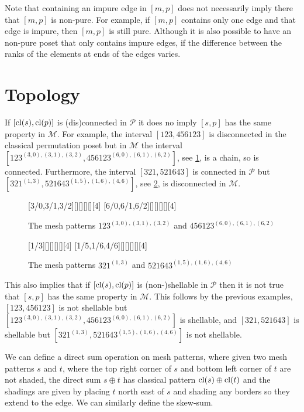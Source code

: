 \documentclass[11pt,a4paper,oneside]{article}
\begin{document}
Note that containing an impure edge in $[m,p]$ does not necessarily imply there
that $[m,p]$ is non-pure. For example, if $[m,p]$ contains only one edge and
that edge is impure, then $[m,p]$ is still pure. Although it is also possible
to have an non-pure poset that only contains impure edges, if the difference
between the ranks of the elements at ends of the edges varies.


\section{Topology}

If $[\operatorname{\textrm{cl}}(s),\operatorname{\textrm{cl}}(p)]$ is (dis)connected in $\mathcal{P}$ it does no imply $[s,p]$
has the same property in $\mathcal{M}$. For example, the interval $[123,456123]$
is disconnected in the classical permutation poset but in $\mathcal{M}$ the
interval $[123^{(3,0),(3,1),(3,2)},456123^{(6,0),(6,1),(6,2)}]$, see
\cref{fig:123}, is a chain, so is connected. Furthermore, the interval
$[321,521643]$ is connected in $\mathcal{P}$ but $[321^{(1, 3)},521643^{(1, 5),
(1, 6), (4, 6)}]$, see \cref{fig:321}, is disconnected in $\mathcal{M}$.

\begin{figure}\centering
{}[3/0,3/1,3/2][][][][][4]
[6/0,6/1,6/2][][][][][4]
\caption{The mesh patterns $123^{(3,0),(3,1),(3,2)}$ and $456123^{(6,0),(6,1),(6,2)}$}\label{fig:123}
\end{figure}
\begin{figure}\centering
{}[1/3][][][][][4]
[1/5,1/6,4/6][][][][][4]
\caption{The mesh patterns $321^{(1, 3)}$ and $521643^{(1, 5), (1, 6), (4, 6)}$}\label{fig:321}
\end{figure}

This also implies that if $[\operatorname{\textrm{cl}}(s),\operatorname{\textrm{cl}}(p)]$ is (non-)shellable in $\mathcal{P}$
then it is not true that $[s,p]$ has the same property in $\mathcal{M}$. This
follows by the previous examples, $[123,456123]$ is not shellable but
$[123^{(3,0),(3,1),(3,2)},456123^{(6,0),(6,1),(6,2)}]$ is shellable, and
$[321,521643]$ is shellable but $[321^{(1, 3)},521643^{(1, 5), (1, 6), (4, 6)}]$
is not shellable.

We can define a direct sum operation on mesh patterns, where given two mesh
patterns $s$ and $t$, where the top right corner of $s$ and bottom left corner
of $t$ are not shaded, the direct sum $s\oplus t$ has classical pattern
$\operatorname{\textrm{cl}}(s)\oplus\operatorname{\textrm{cl}}(t)$ and the shadings are given by placing $t$ north east of $s$
and shading any borders so they extend to the edge. We can similarly define the
skew-sum.
\end{document}
